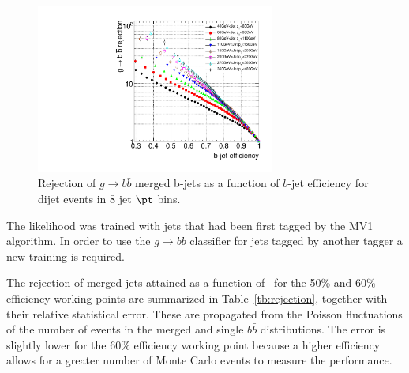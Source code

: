 \begin{figure}[tp]
\centering
\includegraphics[width=0.7\textwidth]{FIGS/Likelihood/KDE_RejvsEff.pdf}
\caption{Rejection of $g\rightarrow b \bar{b}$ merged b-jets as a function of $b$-jet efficiency for dijet events in 8 jet $\pt$ bins.}
\label{fig:performanceinbins}
\end{figure}

The likelihood was trained with jets that had been first tagged by the MV1 algorithm. In order to use the  $g\rightarrow b \bar{b}$ classifier for jets tagged by another tagger a new training is required.

The rejection of merged jets attained as a function of \pt\ for the 50\% and 60\% efficiency working points are summarized in Table~\ref{tb:rejection}, together with their relative statistical error. These are propagated from the Poisson fluctuations of the number of events in the merged and single $b\bar{b}$ distributions. The error is slightly lower for the 60\% efficiency working point because a higher efficiency allows for a greater number of Monte Carlo events to measure the performance. %



